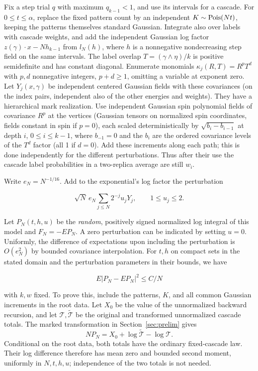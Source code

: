 \documentclass[11pt]{article}
\begin{document}
Fix a step trial $q$ with maximum $q_{k-1}<1$, and use its intervals for a cascade. For $0\le t\le\alpha$, replace the fixed pattern count by an independent $K\sim{\rm Pois}(Nt)$, keeping the patterns themselves standard Gaussian. Integrate also over labels with cascade weights, and add the independent Gaussian log factor $z(\gamma)\cdot x-N h_{k-1}$ from $l_N(h)$, where $h$ is a nonnegative nondecreasing step field on the same intervals. The label overlap $T=(\gamma\wedge\eta)/k$ is positive semidefinite and has constant diagonal. Enumerate monomials
$\kappa_j(R,T)=R^p T^d$ with $p,d$ nonnegative integers, $p+d\ge1$, omitting a variable at exponent zero. Let $Y_j(x,\gamma)$ be independent centered Gaussian fields with these covariances (on the index pairs, independent also of the other energies and weights). They have a hierarchical mark realization. Use independent Gaussian spin polynomial fields of covariance $R^p$ at the vertices (Gaussian tensors on normalized spin coordinates, fields constant in spin if $p=0$), each scaled deterministically by $\sqrt{b_i-b_{i-1}}$ at depth $i$, $0\le i\le k-1$, where $b_{-1}=0$ and the $b_i$ are the ordered covariance levels of the $T^d$ factor (all 1 if $d=0$). Add these increments along each path; this is done independently for the different perturbations. Thus after their use the cascade label probabilities in a two-replica average are still $w_i$.

Write $e_N=N^{-1/16}$. Add to the exponential's log factor the perturbation

\begin{equation*}
\sqrt N\, e_N\sum_{j\le N} 2^{-j} u_j Y_j,\qquad 1\le u_j\le2.
\end{equation*}

Let $P_N(t,h,u)$ be the \emph{random}, positively signed normalized log integral of this model and $F_N=-E P_N$. A zero perturbation can be indicated by setting $u=0$. Uniformly, the difference of expectations upon including the perturbation is $O(e_N^2)$ by bounded covariance interpolation. For $t,h$ on compact sets in the stated domain and the perturbation parameters in their bounds, we have

\begin{equation}\label{eq:enriched-variance}
E|P_N-E P_N|^2\le C/N
\end{equation}

with $k,w$ fixed. To prove this, include the patterns, $K$, and all common Gaussian increments in the root data. Let $X_0$ be the value of the unnormalized backward recursion, and let $\mathcal T,\widetilde{\mathcal T}$ be the original and transformed unnormalized cascade totals. The marked transformation in Section~\ref{sec:prelim} gives
\[
 NP_N=X_0+\log\widetilde{\mathcal T}-\log\mathcal T.
\]
Conditional on the root data, both totals have the ordinary fixed-cascade law. Their log difference therefore has mean zero and bounded second moment, uniformly in $N,t,h,u$; independence of the two totals is not needed.
\end{document}
